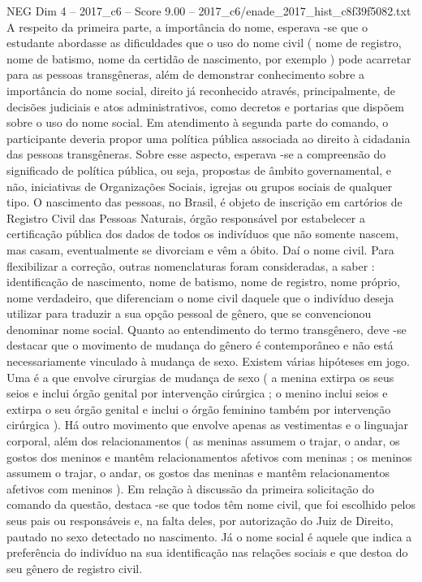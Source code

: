 \begin{textsample}{NEG Dim 4 – 2017\_c6 – Score 9.00 – 2017\_c6/enade\_2017\_hist\_c8f39f5082.txt}
A respeito da primeira parte, a importância do nome, esperava -se que o estudante abordasse as dificuldades que o uso do nome civil ( nome de registro, nome de batismo, nome da certidão de nascimento, por exemplo ) pode acarretar para as pessoas transgêneras, além de demonstrar conhecimento sobre a importância do nome social, direito já reconhecido através, principalmente, de decisões judiciais e atos administrativos, como decretos e portarias que dispõem sobre o uso do nome social.
Em atendimento à segunda parte do comando, o participante deveria propor uma política pública associada ao direito à cidadania das pessoas transgêneras.
Sobre esse aspecto, esperava -se a compreensão do significado de política pública, ou seja, propostas de âmbito governamental, e não, iniciativas de Organizações Sociais, igrejas ou grupos sociais de qualquer tipo.
O nascimento das pessoas, no Brasil, é objeto de inscrição em cartórios de Registro Civil das Pessoas Naturais, órgão responsável por estabelecer a certificação pública dos dados de todos os indivíduos que não somente nascem, mas casam, eventualmente se divorciam e vêm a óbito.
Daí o nome civil.
Para flexibilizar a correção, outras nomenclaturas foram consideradas, a saber : identificação de nascimento, nome de batismo, nome de registro, nome próprio, nome verdadeiro, que diferenciam o nome civil daquele que o indivíduo deseja utilizar para traduzir a sua opção pessoal de gênero, que se convencionou denominar nome social.
Quanto ao entendimento do termo transgênero, deve -se destacar que o movimento de mudança do gênero é contemporâneo e não está necessariamente vinculado à mudança de sexo.
Existem várias hipóteses em jogo.
Uma é a que envolve cirurgias de mudança de sexo ( a menina extirpa os seus seios e inclui órgão genital por intervenção cirúrgica ; o menino inclui seios e extirpa o seu órgão genital e inclui o órgão feminino também por intervenção cirúrgica ).
Há outro movimento que envolve apenas as vestimentas e o linguajar corporal, além dos relacionamentos ( as meninas assumem o trajar, o andar, os gostos dos meninos e mantêm relacionamentos afetivos com meninas ; os meninos assumem o trajar, o andar, os gostos das meninas e mantêm relacionamentos afetivos com meninos ).
Em relação à discussão da primeira solicitação do comando da questão, destaca -se que todos têm nome civil, que foi escolhido pelos seus pais ou responsáveis e, na falta deles, por autorização do Juiz de Direito, pautado no sexo detectado no nascimento.
Já o nome social é aquele que indica a preferência do indivíduo na sua identificação nas relações sociais e que destoa do seu gênero de registro civil.

\end{textsample}
